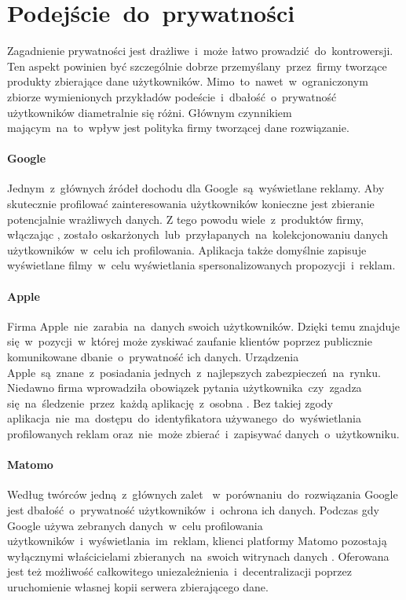 \section{Podejście~do~prywatności}
Zagadnienie prywatności jest drażliwe~i~może łatwo prowadzić~do~kontrowersji. Ten aspekt powinien być szczególnie dobrze przemyślany~przez~firmy tworzące produkty zbierające dane użytkowników. Mimo~to~nawet~w~ograniczonym zbiorze wymienionych przykładów podeście~i~dbałość~o~prywatność użytkowników diametralnie się różni. Głównym czynnikiem mającym~na~to~wpływ jest polityka firmy tworzącej dane rozwiązanie.

\paragraph{Google}
Jednym~z~głównych źródeł dochodu dla Google~są~wyświetlane reklamy. Aby skutecznie profilować zainteresowania użytkowników konieczne jest zbieranie potencjalnie wrażliwych danych. Z tego powodu wiele~z~produktów firmy, włączając , zostało oskarżonych~lub~przyłapanych~na~kolekcjonowaniu danych użytkowników~w~celu ich profilowania. Aplikacja  także domyślnie zapisuje wyświetlane filmy~w~celu wyświetlania spersonalizowanych propozycji~i~reklam.

\paragraph{Apple}
Firma Apple~nie~zarabia~na~danych swoich użytkowników. Dzięki temu znajduje się~w~pozycji~w~której może zyskiwać zaufanie klientów poprzez publicznie komunikowane dbanie~o~prywatność ich danych. Urządzenia Apple~są~znane~z~posiadania jednych~z~najlepszych zabezpieczeń~na~rynku. Niedawno firma wprowadziła obowiązek pytania użytkownika~czy~zgadza się~na~śledzenie~przez~każdą aplikację~z~osobna \cite{Apple_Ad_Transparency}. Bez takiej zgody aplikacja~nie~ma~dostępu~do~identyfikatora używanego~do~wyświetlania profilowanych reklam oraz~nie~może zbierać~i~zapisywać danych~o~użytkowniku.

\paragraph{Matomo}
Według twórców jedną~z~głównych zalet ~w~porównaniu~do~rozwiązania Google jest dbałość~o~prywatność użytkowników~i~ochrona ich danych. Podczas gdy Google używa zebranych danych~w~celu profilowania użytkowników~i~wyświetlania~im~reklam, klienci platformy Matomo pozostają wyłącznymi właścicielami zbieranych~na~swoich witrynach danych \cite{Matomo_Data}. Oferowana jest też możliwość całkowitego uniezależnienia~i~decentralizacji poprzez uruchomienie własnej kopii serwera zbierającego dane.

